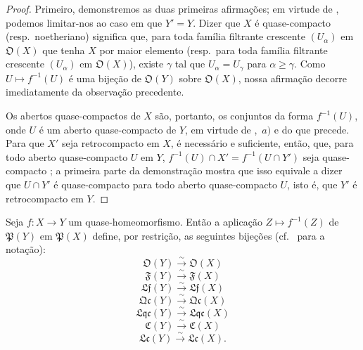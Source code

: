 \begin{proof}
Primeiro, demonstremos as duas primeiras afirmações; em virtude de , podemos limitar-nos ao caso em que $Y'=Y$.
Dizer que $X$ é quase-compacto (resp.\ noetheriano) significa que, para toda família filtrante crescente $(U_\alpha)$ em $\mathfrak{O}(X)$ que tenha $X$ por maior elemento (resp.\ para toda família filtrante crescente $(U_\alpha)$ em $\mathfrak{O}(X)$), existe $\gamma$ tal que $U_\alpha=U_\gamma$ para $\alpha\geq\gamma$.
Como $U\mapsto f^{-1}(U)$ é uma bijeção de $\mathfrak{O}(Y)$ sobre $\mathfrak{O}(X)$, nossa afirmação decorre imediatamente da observação precedente.

Os abertos quase-compactos de $X$ são, portanto, os conjuntos da forma $f^{-1}(U)$, onde $U$ é um aberto quase-compacto de $Y$, em virtude de ,~$a)$ e do que precede.
Para que $X'$ seja retrocompacto em $X$, é necessário e suficiente, então, que, para todo aberto quase-compacto $U$ em $Y$, $f^{-1}(U)\cap X'=f^{-1}(U\cap Y')$ seja quase-compacto ; a primeira parte da demonstração mostra que isso equivale a dizer que $U\cap Y'$ é quase-compacto para todo aberto quase-compacto $U$, isto é, que $Y'$ é retrocompacto em $Y$.
\end{proof}

\begin{proposition}[10.2.7]
\label{IV.10.2.7}
Seja $f:X\to Y$ um quase-homeomorfismo.
Então a aplicação $Z\mapsto f^{-1}(Z)$ de $\mathfrak{P}(Y)$ em $\mathfrak{P}(X)$ define, por restrição, as seguintes bijeções (cf.\  para a notação):
\[
  \mathfrak{O}(Y)\xrightarrow{\sim}\mathfrak{O}(X)
\]
\[
  \mathfrak{F}(Y)\xrightarrow{\sim}\mathfrak{F}(X)
\]
\[
  \mathfrak{Lf}(Y)\xrightarrow{\sim}\mathfrak{Lf}(X)
\]
\[
  \mathfrak{Qc}(Y)\xrightarrow{\sim}\mathfrak{Qc}(X)
\]
\[
  \mathfrak{Lqc}(Y)\xrightarrow{\sim}\mathfrak{Lqc}(X)
\]
\[
  \mathfrak{C}(Y)\xrightarrow{\sim}\mathfrak{C}(X)
\]
\[
  \mathfrak{Lc}(Y)\xrightarrow{\sim}\mathfrak{Lc}(X).
\]
\end{proposition}

